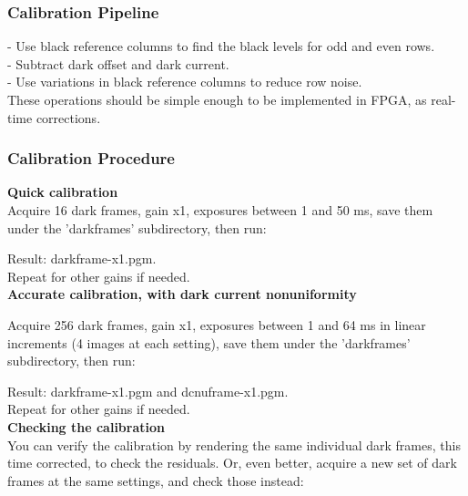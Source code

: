 \subsubsection{Calibration Pipeline}

- Use black reference columns to find the black levels for odd and even rows.\\
- Subtract dark offset and dark current.\\
- Use variations in black reference columns to reduce row noise.\\ 

These operations should be simple enough to be implemented in FPGA, as real-time corrections. 





\subsubsection{Calibration Procedure}

\textbf{Quick calibration}\\

Acquire 16 dark frames, gain x1, exposures between 1 and 50 ms, save them under the 'darkframes' subdirectory, then run: 


Result: darkframe-x1.pgm.\\

Repeat for other gains if needed.\\ 


\textbf{Accurate calibration, with dark current nonuniformity}

Acquire 256 dark frames, gain x1, exposures between 1 and 64 ms in linear increments (4 images at each setting), save them under the 'darkframes' subdirectory, then run: 


Result: darkframe-x1.pgm and dcnuframe-x1.pgm.\\

Repeat for other gains if needed. \\

\textbf{Checking the calibration}\\

You can verify the calibration by rendering the same individual dark frames, this time corrected, to check the residuals. Or, even better, acquire a new set of dark frames at the same settings, and check those instead: 


